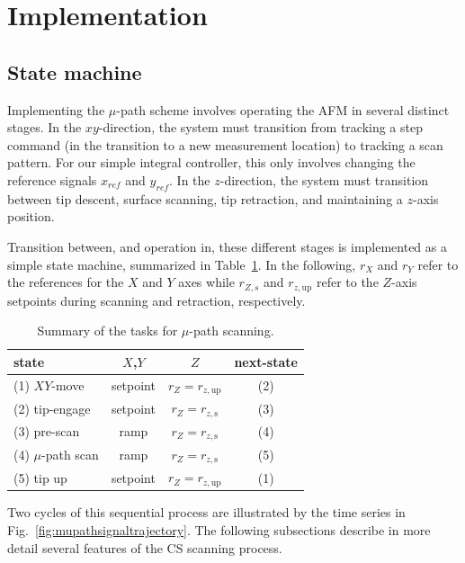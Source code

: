 \documentclass[twocolumn,oneside]{IEEEtran/IEEEtran}
\newcommand{\rzup}{\ensuremath{r_{z,\textrm{up}}}\xspace}
\newcommand{\rzs}{\ensuremath{r_{z,\textrm{s}}}\xspace}
\begin{document}
\section{Implementation}\label{sec:implementation}
	
\subsection{State machine}
Implementing the $\mu$-path scheme involves operating the AFM in several
distinct stages. In the $xy$-direction, the system must transition from tracking
a step command (in the transition to a new measurement location) to tracking a
scan pattern. For our simple integral controller, this only involves changing
the reference signals $x_{ref}$ and $y_{ref}$.
In the $z$-direction, the system
must transition between tip descent, surface scanning, tip retraction, and
maintaining a $z$-axis position.

	
Transition between, and operation in, these different stages is implemented as a
simple state machine, summarized in Table~\ref{tab:cs_tasks}. 
In the following, $r_X$ and $r_Y$ refer to the references for the $X$ and $Y$ axes while $r_{Z,s}$ and $\rzup$ refer to the $Z$-axis setpoints during scanning and retraction, respectively.

\begin{table}
  \centering
  \caption{Summary of the tasks for $\mu$-path scanning.}
  \begin{tabular}{lccc}
    state & $X$,$Y$ & $Z$ & next-state\\
    \toprule
    (1) $XY$-move & setpoint & $r_Z = \rzup$ & (2)\\
    (2) tip-engage & setpoint & $r_Z = \rzs$ & (3)\\
    (3) pre-scan & ramp & $r_Z = \rzs$ & (4)\\
    (4) $\mu$-path scan & ramp & $r_Z = \rzs$ & (5)\\
    (5) tip up & setpoint & $r_Z = \rzup$ & (1)\\
  \end{tabular}
  \label{tab:cs_tasks}
\end{table}
Two cycles of this sequential process are illustrated by the time series in
Fig.~\ref{fig:mupathsignaltrajectory}. The following subsections describe in
more detail several features of the CS scanning process.
  
\end{document}
